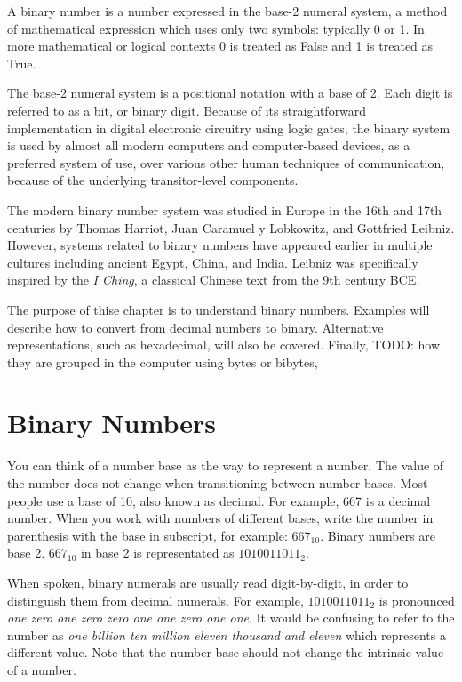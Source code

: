 \documentclass[letterpaper, 10pt]{book}
\begin{document}
A binary number is a number expressed in the base-2 numeral system, a method of mathematical 
expression which uses only two symbols: typically 0 or 1. In more mathematical or logical contexts 
0 is treated as False and 1 is treated as True.

The base-2 numeral system is a positional notation with a base of 2. Each digit is referred to as 
a bit, or binary digit. Because of its straightforward implementation in digital electronic 
circuitry using logic gates, the binary system is used by almost all modern computers and 
computer-based devices, as a preferred system of use, over various other human techniques of 
communication, because of the underlying transitor-level components.

The modern binary number system was studied in Europe in the 16th and 17th centuries by Thomas 
Harriot, Juan Caramuel y Lobkowitz, and Gottfried Leibniz. However, systems related to binary 
numbers have appeared earlier in multiple cultures including ancient Egypt, China, and India. 
Leibniz was specifically inspired by the \textit{I Ching}, a classical Chinese text from the 9th century BCE. 

The purpose of thise chapter is to understand binary numbers. Examples will describe how to convert
from decimal numbers to binary. Alternative representations, such as hexadecimal, will also be
covered. Finally, TODO: how they are grouped in the computer using bytes or bibytes, 

\section{Binary Numbers\label{sec:data:bases}}

You can think of a number base as the way to represent a number. The value of the number does not 
change when transitioning between number bases. Most people use a base of 10, also known as decimal. 
For example, 667 is a decimal number. When you work with numbers of different bases, write the number 
in parenthesis with the base in subscript, for example: $667_{10}$. Binary numbers are base 2. 
$667_{10}$ in base 2 is representated as $1010011011_2$. 

When spoken, binary numerals are usually read digit-by-digit, in order to distinguish them from 
decimal numerals. For example, $1010011011_2$ is pronounced \textit{one zero one zero zero one 
one zero one one}. It would be confusing to refer to the number as \textit{one billion ten million 
eleven thousand and eleven} which represents a different value. Note that the number base should 
not change the intrinsic value of a number.
\end{document}
